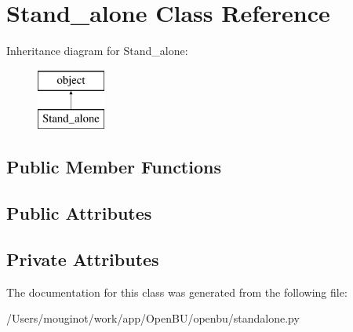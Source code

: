 \hypertarget{classopenbu_1_1standalone_1_1_stand__alone}{}\section{Stand\+\_\+alone Class Reference}
\label{classopenbu_1_1standalone_1_1_stand__alone}
Inheritance diagram for Stand\+\_\+alone\+:\begin{figure}[H]
\begin{center}
\leavevmode
\includegraphics[height=2.000000cm]{classopenbu_1_1standalone_1_1_stand__alone}
\end{center}
\end{figure}
\subsection*{Public Member Functions}
\subsection*{Public Attributes}
\subsection*{Private Attributes}


The documentation for this class was generated from the following file\+:\begin{DoxyCompactItemize}
\item 
/\+Users/mouginot/work/app/\+Open\+B\+U/openbu/standalone.\+py\end{DoxyCompactItemize}
